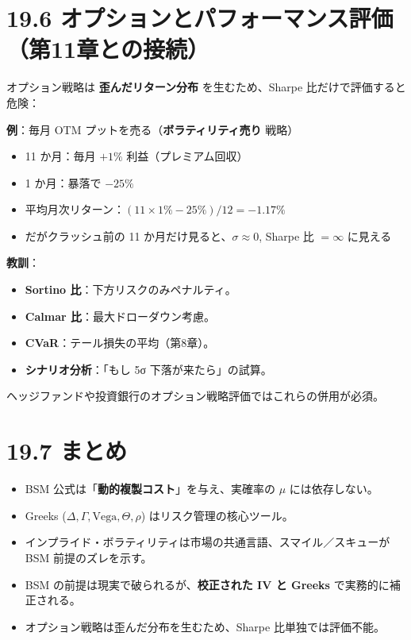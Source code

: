 \documentclass[11pt,a4paper]{report}
\begin{document}
\section{19.6 オプションとパフォーマンス評価（第11章との接続）}

オプション戦略は \textbf{歪んだリターン分布} を生むため、Sharpe 比だけで評価すると危険：

\textbf{例}：毎月 OTM プットを売る（\textbf{ボラティリティ売り} 戦略）
\begin{itemize}
\item 11 か月：毎月 $+1\%$ 利益（プレミアム回収）
\item 1 か月：暴落で $-25\%$
\item 平均月次リターン：$(11 \times 1\% - 25\%)/12 = -1.17\%$
\item だがクラッシュ前の 11 か月だけ見ると、$\sigma \approx 0$, Sharpe 比 $= \infty$ に見える
\end{itemize}

\textbf{教訓}：
\begin{itemize}
\item \textbf{Sortino 比}：下方リスクのみペナルティ。
\item \textbf{Calmar 比}：最大ドローダウン考慮。
\item \textbf{CVaR}：テール損失の平均（第8章）。
\item \textbf{シナリオ分析}：「もし 5σ 下落が来たら」の試算。
\end{itemize}

ヘッジファンドや投資銀行のオプション戦略評価ではこれらの併用が必須。

\section{19.7 まとめ}

\begin{itemize}
\item BSM 公式は「\textbf{動的複製コスト}」を与え、実確率の $\mu$ には依存しない。
\item Greeks ($\Delta, \Gamma, \mathrm{Vega}, \Theta, \rho$) はリスク管理の核心ツール。
\item インプライド・ボラティリティは市場の共通言語、スマイル／スキューが BSM 前提のズレを示す。
\item BSM の前提は現実で破られるが、\textbf{校正された IV と Greeks} で実務的に補正される。
\item オプション戦略は歪んだ分布を生むため、Sharpe 比単独では評価不能。
\end{itemize}
\end{document}
